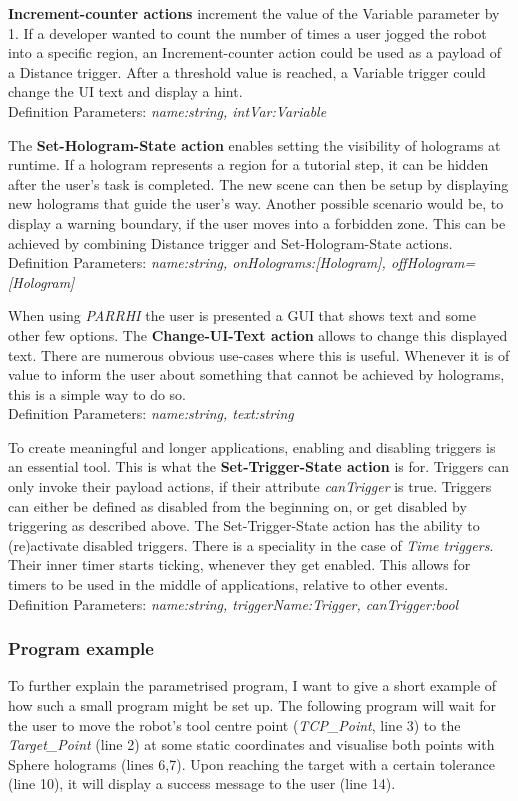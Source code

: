 \textbf{Increment-counter actions} increment the value of the Variable parameter by 1. If a developer wanted to count the number of times a user jogged the robot into a specific region, an Increment-counter action could be used as a payload of a Distance trigger. After a threshold value is reached, a Variable trigger could change the UI text and display a hint.\\Definition Parameters: \textit{name:string, intVar:Variable}

The \textbf{Set-Hologram-State action} enables setting the visibility of holograms at runtime. If a hologram represents a region for a tutorial step, it can be hidden after the user's task is completed. The new scene can then be setup by displaying new holograms that guide the user's way. Another possible scenario would be, to display a warning boundary, if the user moves into a forbidden zone. This can be achieved by combining Distance trigger and Set-Hologram-State actions.\\Definition Parameters: \textit{name:string, onHolograms:[Hologram], offHologram=[Hologram]}

When using \textit{PARRHI} the user is presented a GUI that shows text and some other few options. The \textbf{Change-UI-Text action} allows to change this displayed text. There are numerous obvious use-cases where this is useful. Whenever it is of value to inform the user about something that cannot be achieved by holograms, this is a simple way to do so.\\Definition Parameters: \textit{name:string, text:string}

To create meaningful and longer applications, enabling and disabling triggers is an essential tool. This is what the \textbf{Set-Trigger-State action} is for. Triggers can only invoke their payload actions, if their attribute \textit{canTrigger} is true. Triggers can either be defined as disabled from the beginning on, or get disabled by triggering as described above. The Set-Trigger-State action has the ability to (re)activate disabled triggers. There is a speciality in the case of \textit{Time triggers}. Their inner timer starts ticking, whenever they get enabled. This allows for timers to be used in the middle of applications, relative to other events.\\Definition Parameters: \textit{name:string, triggerName:Trigger, canTrigger:bool}

\subsubsection{Program example}
To further explain the parametrised program, I want to give a short example of how such a small program might be set up. The following program will wait for the user to move the robot's tool centre point (\textit{TCP\_Point}, line 3) to the \textit{Target\_Point} (line 2) at some static coordinates and visualise both points with Sphere holograms (lines 6,7). Upon reaching the target with a certain tolerance (line 10), it will display a success message to the user (line 14).

